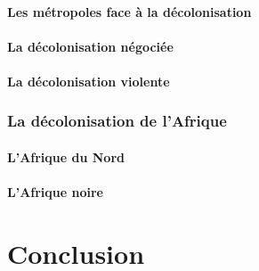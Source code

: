 \documentclass[12pt]{report}
\begin{document}
\subsection{Les métropoles face à la décolonisation}

\subsection{La décolonisation négociée}

\subsection{La décolonisation violente}

\section{La décolonisation de l'Afrique}

\subsection{L'Afrique du Nord}

\subsection{L'Afrique noire}


\part*{Conclusion}
\end{document}
